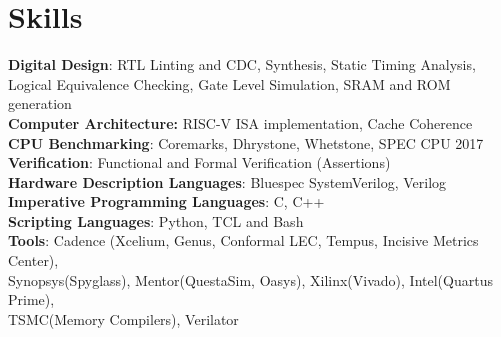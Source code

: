\section{\sc Skills}

{\bf{Digital Design}}: RTL Linting and CDC, Synthesis, Static Timing Analysis,\\
 Logical Equivalence Checking, Gate Level Simulation, SRAM and ROM generation \\
{\bf{Computer Architecture:}} RISC-V ISA implementation, Cache Coherence\\
{\bf{CPU Benchmarking}}: Coremarks, Dhrystone, Whetstone, SPEC CPU 2017 \\
{\bf{Verification}}: Functional and Formal Verification (Assertions)\\
{\bf{Hardware Description Languages}}: Bluespec SystemVerilog, Verilog \\
{\bf{Imperative Programming Languages}}: C, C++ \\
{\bf{Scripting Languages}}: Python, TCL and Bash  \\
{\bf{Tools}}: Cadence (Xcelium, Genus, Conformal LEC, Tempus, Incisive Metrics Center), \\
Synopsys(Spyglass), Mentor(QuestaSim, Oasys), Xilinx(Vivado), Intel(Quartus Prime), 
\\ TSMC(Memory Compilers), Verilator 

\endinput

